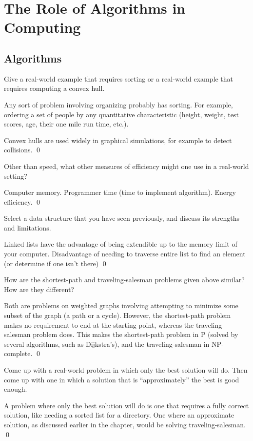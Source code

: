 \chapter{The Role of Algorithms in Computing}
\section{Algorithms}

 Give a real-world example that requires sorting or a real-world example that requires computing a convex hull.

\sol Any sort of problem involving organizing probably has sorting. For example, ordering a set of people by any quantitative characteristic (height, weight, test scores, age, their one mile run time, etc.).

Convex hulls are used widely in graphical simulations, for example to detect collisions. \qed

 Other than speed, what other measures of efficiency might one use in a real-world setting?

\sol Computer memory. Programmer time (time to implement algorithm). Energy efficiency. \qed

 Select a data structure that you have seen previously, and discuss its strengths and limitations.

\sol Linked lists have the advantage of being extendible up to the memory limit of your computer. Disadvantage of needing to traverse entire list to find an element (or determine if one isn't there) \qed

 How are the shortest-path and traveling-salesman problems given above similar? How are they different?

\sol Both are problems on weighted graphs involving attempting to minimize some subset of the graph (a path or a cycle). However, the shortest-path problem makes no requirement to end at the starting point, whereas the traveling-salesman problem does. This makes the shortest-path problem in P (solved by several algorithms, such as Dijkstra's), and the traveling-salesman in NP-complete. \qed

 Come up with a real-world problem in which only the best solution will do. Then come up with one in which a solution that is ``approximately'' the best is good enough.

\sol A problem where only the best solution will do is one that requires a fully correct solution, like needing a sorted list for a directory. One where an approximate solution, as discussed earlier in the chapter, would be solving traveling-salesman. \qed

